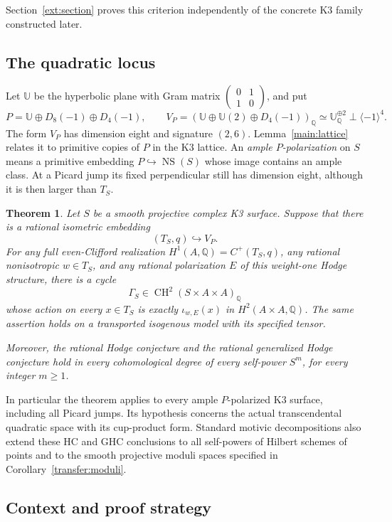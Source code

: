 \documentclass[11pt]{amsart}
\newcommand{\Q}{\mathbb Q}
\DeclareMathOperator{\NS}{NS}
\DeclareMathOperator{\CH}{CH}
\newtheorem{theorem}{Theorem}[section]
\theoremstyle{definition}
\theoremstyle{remark}
\numberwithin{equation}{section}
\begin{document}
Section~\ref{ext:section} proves this criterion independently of the
concrete K3 family constructed later.

\subsection{The quadratic locus}

Let $\mathbb U$ be the hyperbolic plane with Gram matrix
$\left(\begin{smallmatrix}0&1\\1&0\end{smallmatrix}\right)$, and put
\[
 P=\mathbb U\oplus D_8(-1)\oplus D_4(-1),\qquad
 V_P=(\mathbb U\oplus\mathbb U(2)\oplus D_4(-1))_{\Q}
     \simeq\mathbb U_{\Q}^{\oplus2}\perp\langle-1\rangle^4.
\]
The form $V_P$ has dimension eight and signature $(2,6)$.
Lemma~\ref{main:lattice} relates it to primitive copies of $P$ in
the K3 lattice.  An \emph{ample $P$-polarization} on $S$ means a
primitive embedding $P\hookrightarrow\NS(S)$ whose image contains
an ample class.  At a Picard jump its fixed perpendicular still has
dimension eight, although it is then larger than $T_S$.

\begin{theorem}\label{main:theorem}
Let $S$ be a smooth projective complex K3 surface.  Suppose that
there is a rational isometric embedding
\[
 (T_S,q)\hookrightarrow V_P.
\]
For any full even-Clifford realization $H^1(A,\Q)=C^+(T_S,q)$, any
rational nonisotropic $w\in T_S$, and any rational polarization $E$
of this weight-one Hodge structure, there is a cycle
\[
 \Gamma_S\in\CH^2(S\times A\times A)_{\Q}
\]
whose action on every $x\in T_S$ is exactly $\iota_{w,E}(x)$ in
$H^2(A\times A,\Q)$.  The same assertion holds on a transported
isogenous model with its specified tensor.

Moreover, the rational Hodge conjecture and the rational generalized
Hodge conjecture hold in every cohomological degree of every self-power
$S^m$, for every integer $m\ge1$.
\end{theorem}

In particular the theorem applies to every ample $P$-polarized K3
surface, including all Picard jumps.  Its hypothesis concerns the
actual transcendental quadratic space with its cup-product form.
Standard motivic decompositions also extend these HC and GHC conclusions
to all self-powers of Hilbert schemes of points and to the smooth
projective moduli spaces specified in Corollary~\ref{transfer:moduli}.

\subsection{Context and proof strategy}
\end{document}
